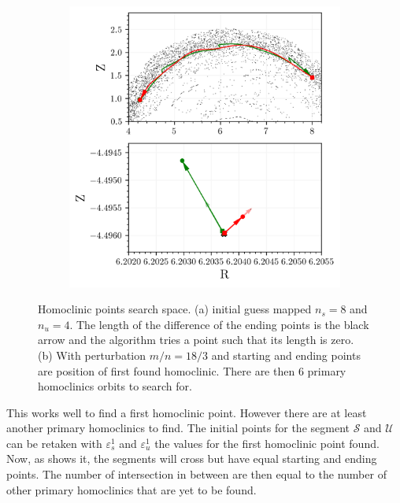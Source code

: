 \begin{figure}[h!]
\begin{subfigure}[c]{0.58\textwidth}
        \includegraphics[width=\textwidth]{images/clinicsearch/search_domain.png}
        \caption{}
        \label{fig:clinic-search-b}
    \end{subfigure}
    \caption{Homoclinic points search space. (a) initial guess mapped $n_s = 8$ and $n_u = 4$. The length of the difference of the ending points is the black arrow and the algorithm tries a point such that its length is zero. (b) With perturbation $m/n = 18/3$ and starting and ending points are position of first found homoclinic. There are then 6 primary homoclinics orbits to search for.}
    \label{fig:clinic-search}
\end{figure}

This works well to find a first homoclinic point. However there are at least another primary homoclinics to find. The initial points for the segment $\mathcal{S}$ and $\mathcal{U}$ can be retaken with $\varepsilon_s^1$ and $\varepsilon_u^1$ the values for the first homoclinic point found. Now, as  shows it, the segments will cross but have equal starting and ending points. The number of intersection in between are then equal to the number of other primary homoclinics that are yet to be found.

